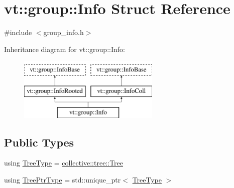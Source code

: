 \hypertarget{structvt_1_1group_1_1_info}{}\section{vt\+:\+:group\+:\+:Info Struct Reference}
\label{structvt_1_1group_1_1_info}


{\ttfamily \#include $<$group\+\_\+info.\+h$>$}

Inheritance diagram for vt\+:\+:group\+:\+:Info\+:\begin{figure}[H]
\begin{center}
\leavevmode
\includegraphics[height=3.000000cm]{structvt_1_1group_1_1_info}
\end{center}
\end{figure}
\subsection*{Public Types}
\begin{DoxyCompactItemize}
\item 
using \hyperlink{structvt_1_1group_1_1_info_a7682ac1b37adcfcc2f10edee9d34bdc8}{Tree\+Type} = \hyperlink{structvt_1_1collective_1_1tree_1_1_tree}{collective\+::tree\+::\+Tree}
\item 
using \hyperlink{structvt_1_1group_1_1_info_ad381b46b3d09499ac670457aa3b5a0ba}{Tree\+Ptr\+Type} = std\+::unique\+\_\+ptr$<$ \hyperlink{structvt_1_1group_1_1_info_base_a96e01b6097ed7b2bc299027d0a7a1b1e}{Tree\+Type} $>$
\end{DoxyCompactItemize}
